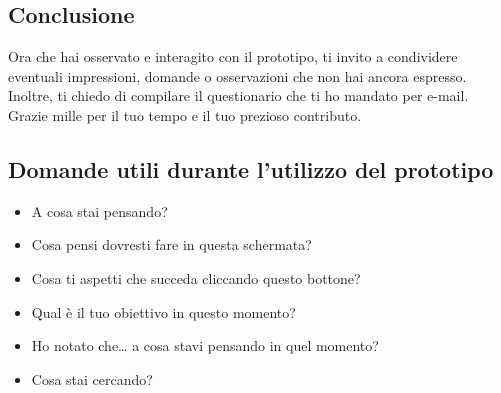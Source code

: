 \documentclass{article}
\begin{document}
\subsection{Conclusione}
Ora che hai osservato e interagito con il prototipo, ti invito a condividere eventuali impressioni, domande o osservazioni che non hai ancora espresso. Inoltre, ti chiedo di compilare il questionario che ti ho mandato per e-mail. Grazie mille per il tuo tempo e il tuo prezioso contributo. 

\subsection{Domande utili durante l’utilizzo del prototipo}
\begin{itemize}
    \item A cosa stai pensando?
    \item Cosa pensi dovresti fare in questa schermata?
    \item Cosa ti aspetti che succeda cliccando questo bottone?
    \item Qual \`e il tuo obiettivo in questo momento?
    \item Ho notato che… a cosa stavi pensando in quel momento?
    \item Cosa stai cercando?
\end{itemize}
\end{document}

